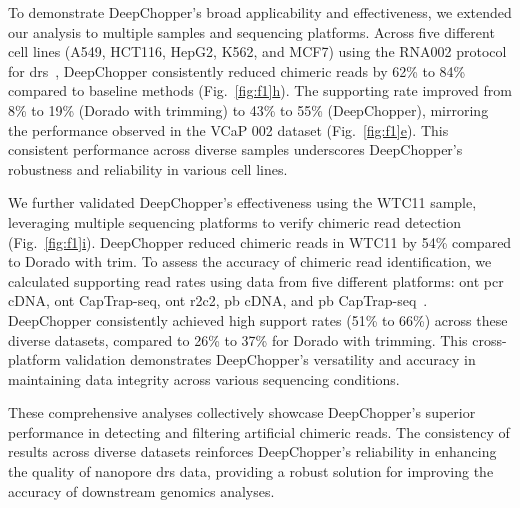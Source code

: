 \documentclass[pdflatex, sn-mathphys-num, lineno]{sn-jnl}%
\newcommand{\figref}[2]{Fig.~\hyperref[#1]{\ref*{#1}#2}}
\theoremstyle{thmstyleone}%
\theoremstyle{thmstyletwo}%
\theoremstyle{thmstylethree}%
\begin{document}
To demonstrate DeepChopper's broad applicability  and effectiveness, we extended our analysis to multiple samples and sequencing platforms.
Across five different cell lines (A549, HCT116, HepG2, K562, and MCF7) using the RNA002 protocol for \gls{drs}~\cite{chen2021systematic}, DeepChopper consistently reduced chimeric reads by 62\% to 84\% compared to baseline methods (\figref{fig:f1}{h}).
The supporting rate improved from 8\% to 19\% (Dorado with trimming) to 43\% to 55\% (DeepChopper), mirroring the performance observed in the VCaP 002 dataset (\figref{fig:f1}{e}).
This consistent performance across diverse samples underscores DeepChopper's robustness and reliability in various cell lines.

We further validated DeepChopper's effectiveness using the WTC11 sample, leveraging multiple sequencing platforms to verify chimeric read detection (\figref{fig:f1}{i}).
DeepChopper reduced chimeric reads in WTC11 by 54\% compared to Dorado with trim.
To assess the accuracy of chimeric read identification, we calculated supporting read rates using data from five different platforms: \gls{ont} \gls{pcr} cDNA, \gls{ont} CapTrap-seq, \gls{ont} \gls{r2c2}, \gls{pb} cDNA, and \gls{pb} CapTrap-seq~\cite{carbonell2024captrap}.
DeepChopper consistently achieved high support rates (51\% to 66\%) across these diverse datasets, compared to 26\% to 37\% for Dorado with trimming.
This cross-platform validation demonstrates DeepChopper's versatility and accuracy in maintaining data integrity across various sequencing conditions.

These comprehensive analyses collectively showcase DeepChopper's superior performance in detecting and filtering artificial chimeric reads.
The consistency of results across diverse datasets reinforces DeepChopper's reliability in enhancing the quality of nanopore \gls{drs} data, providing a robust solution for improving the accuracy of downstream genomics analyses.
\end{document}
